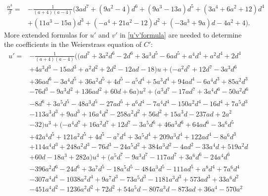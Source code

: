 \documentclass{gtpart}
\theoremstyle{definition}
\theoremstyle{remark}
\newcommand{\A}{\alpha}
\begin{document}
\begin{equation*}
\begin{split}
 \frac{\A^3}{\beta} = & -\frac{1}{(a + 4) (a - 4)} \big( 3 a d^7 + (9 a^2 - 4) d^6 + (9 a^3 - 13 a) d^5 + (3 a^4 + 6 a^2 + 12) d^4 \\
                      & + (11 a^3 - 15 a) d^3 + (-a^4 + 21 a^2 - 12) d^2 + (-3 a^3 + 9 a) d - 4 a^2 + 4 \big).  
\end{split}
\end{equation*}
More extended formulas for $u'$ and $v'$ in \eqref{u'v'formula} are needed to determine the coefficients in the Weierstrass equation of $C'$: 
\begin{equation*}
\begin{split}
 u' = & -\frac{1}{(a + 4) (a - 4)} \big( (a d^7 + 3 a^2 d^6 - 2 d^6 + 3 a^3 d^5 - 6 a d^5 + a^4 d^4 + a^2 d^4 + 2 d^4 \\
      & + 4 a^3 d^3 - 15 a d^3 + a^2 d^2 + 2 d^2 - 12 a d - 18) u + (-a^2 d^7 + 12 d^7 - 3 a^3 d^6 \\
      & + 36 a d^6 - 3 a^4 d^5 + 36 a^2 d^5 + 4 d^5 - a^5 d^4 + 5 a^3 d^4 + 94 a d^4 - 6 a^4 d^3 + 85 a^2 d^3 \\
      & - 76 d^3 - 9 a^3 d^2 + 136 a d^2 + 60 d + 6 a) u^2 + (a^3 d^7 - 17 a d^7 + 3 a^4 d^6 - 50 a^2 d^6 \\
      & - 8 d^6 + 3 a^5 d^5 - 48 a^3 d^5 - 27 a d^5 + a^6 d^4 - 7 a^4 d^4 - 150 a^2 d^4 - 16 d^4 + 7 a^5 d^3 \\
      & - 113 a^3 d^3 + 9 a d^3 + 16 a^4 d^2 - 258 a^2 d^2 + 56 d^2 + 15 a^3 d - 237 a d+2 a^2 \\
      & - 32) u^3 + (-a^4 d^7 + 16 a^2 d^7 + 12 d^7 - 3 a^5 d^6 + 46 a^3 d^6 + 64 a d^6 - 3 a^6 d^5 \\
      & + 42 a^4 d^5 + 121 a^2 d^5 + 4 d^5 - a^7 d^4 + 3 a^5 d^4 + 209 a^3 d^4 + 122 a d^4 - 8 a^6 d^3 \\
      & + 114 a^4 d^3 + 248 a^2 d^3 - 76 d^3 - 24 a^5 d^2 + 384 a^3 d^2 - 4 a d^2 - 33 a^4 d + 519 a^2 d \\
      & + 60 d - 18 a^3 + 282 a) u^4 + (a^5 d^7 - 9 a^3 d^7 - 117 a d^7 + 3 a^6 d^6 - 24 a^4 d^6 \\
      & - 396 a^2 d^6 - 24 d^6 + 3 a^7 d^5 - 18 a^5 d^5 - 484 a^3 d^5 - 111 a d^5 + a^8 d^4 + 7 a^6 d^4 \\
      & - 307 a^4 d^4 - 1038 a^2 d^4 + 9 a^7 d^3 - 73 a^5 d^3 - 1181 a^3 d^3 + 573 a d^3 + 33 a^6 d^2 \\
      & - 451 a^4 d^2 - 1236 a^2 d^2 + 72 d^2 + 54 a^5 d - 807 a^3 d - 873 a d + 36 a^4 - 570 a^2 \\

\end{split}
\end{equation*}
\end{document}
